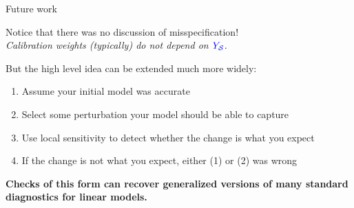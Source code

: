 \begin{frame}{Future work}

Notice that there was no discussion of misspecification!\\[1em]

\emph{Calibration weights (typically) do not depend on $\textcolor{blue}{Y_{\mathcal{S}}}$.}

\pause

\vspace{2em}
But the high level idea can be extended much more widely:
%
\begin{enumerate}
\item Assume your initial model was accurate
\item Select some perturbation your model should be able to capture
\item Use local sensitivity to detect whether the change is what you expect
\item If the change is not what you expect, either (1) or (2) was wrong
\end{enumerate}
%

\pause

\vspace{2em}
\textbf{
Checks of this form can recover generalized versions of many standard diagnostics for linear models.
}
\end{frame}


